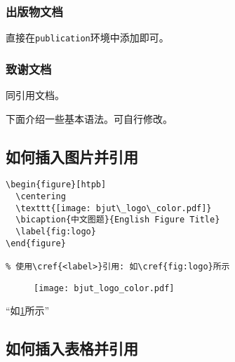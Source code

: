 \subsubsection{出版物文档}

直接在\verb|publication|环境中添加即可。

\subsubsection{致谢文档}

同引用文档。

下面介绍一些基本语法。可自行修改。
\subsection{如何插入图片并引用}

\begin{center}
  \begin{minipage}{0.95\textwidth}
    \begin{Verbatim}[frame=single]
\begin{figure}[htpb]
  \centering
  \texttt{[image: bjut\_logo\_color.pdf]}
  \bicaption{中文图题}{English Figure Title}
  \label{fig:logo}
\end{figure}

% 使用\cref{<label>}引用: 如\cref{fig:logo}所示
    \end{Verbatim}
  \end{minipage}
\end{center}

\begin{figure}[htpb]
  \centering
  \texttt{[image: bjut\_logo\_color.pdf]}
  \label{fig:logo}
\end{figure}
“如\cref{fig:logo}所示”

\subsection{如何插入表格并引用}

